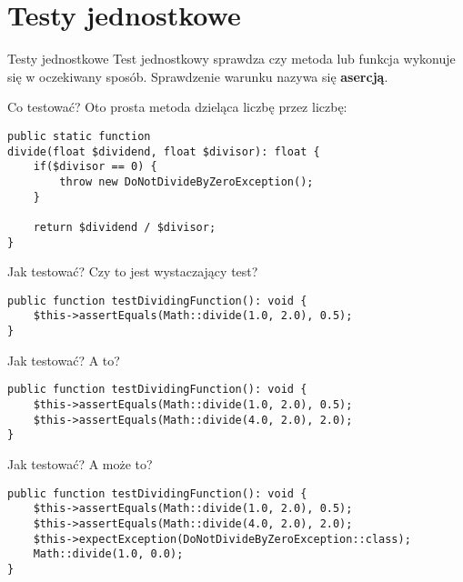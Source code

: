 \section{Testy jednostkowe}

\begin{frame}{Testy jednostkowe}
	Test jednostkowy sprawdza czy metoda lub funkcja wykonuje się w oczekiwany sposób. Sprawdzenie warunku nazywa się \textbf{asercją}.
\end{frame}

\begin{frame}[fragile]{Co testować?}
	Oto prosta metoda dzieląca liczbę przez liczbę:

\begin{lstlisting}
public static function
divide(float $dividend, float $divisor): float {
    if($divisor == 0) {
        throw new DoNotDivideByZeroException();
    }
    
    return $dividend / $divisor;
}
\end{lstlisting}
\end{frame}

\begin{frame}[fragile]{Jak testować?}
	Czy to jest wystaczający test?

\begin{lstlisting}
public function testDividingFunction(): void {
    $this->assertEquals(Math::divide(1.0, 2.0), 0.5);
}
\end{lstlisting}
\end{frame}

\begin{frame}[fragile]{Jak testować?}
	A to?
	
\begin{lstlisting}
public function testDividingFunction(): void {
    $this->assertEquals(Math::divide(1.0, 2.0), 0.5);
    $this->assertEquals(Math::divide(4.0, 2.0), 2.0);
}
\end{lstlisting}
\end{frame}

\begin{frame}[fragile]{Jak testować?}
	A może to?
	
\begin{lstlisting}
public function testDividingFunction(): void {
    $this->assertEquals(Math::divide(1.0, 2.0), 0.5);
    $this->assertEquals(Math::divide(4.0, 2.0), 2.0);
    $this->expectException(DoNotDivideByZeroException::class);
    Math::divide(1.0, 0.0);
}
\end{lstlisting}
\end{frame}

